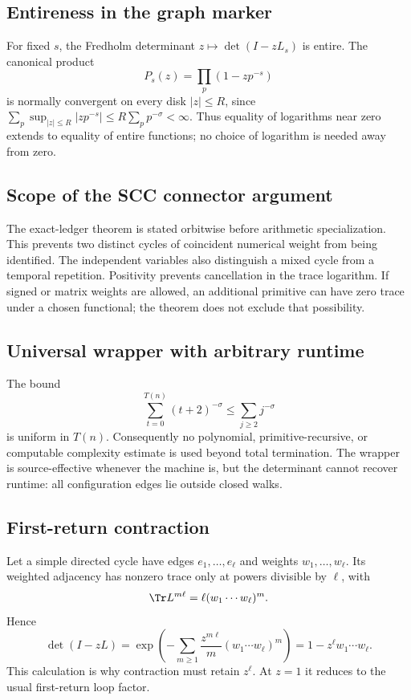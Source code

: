 \subsection{Entireness in the graph marker}

For fixed $s$, the Fredholm determinant $z\mapsto\det(I-zL_s)$ is entire.
The canonical product
\[
P_s(z)=\prod_p(1-zp^{-s})
\]
is normally convergent on every disk $|z|\le R$, since
$\sum_p\sup_{|z|\le R}|zp^{-s}|\le R\sum_pp^{-\sigma}<\infty$.
Thus equality of logarithms near zero extends to equality of entire
functions; no choice of logarithm is needed away from zero.

\subsection{Scope of the SCC connector argument}

The exact-ledger theorem is stated orbitwise before arithmetic
specialization.  This prevents two distinct cycles of coincident numerical
weight from being identified.  The independent variables also distinguish a
mixed cycle from a temporal repetition.  Positivity prevents cancellation in
the trace logarithm.  If signed or matrix weights are allowed, an additional
primitive can have zero trace under a chosen functional; the theorem does not
exclude that possibility.

\subsection{Universal wrapper with arbitrary runtime}

The bound
\[
\sum_{t=0}^{T(n)}(t+2)^{-\sigma}
\le\sum_{j\ge2}j^{-\sigma}
\]
is uniform in $T(n)$.  Consequently no polynomial, primitive-recursive, or
computable complexity estimate is used beyond total termination.  The
wrapper is source-effective whenever the machine is, but the determinant
cannot recover runtime: all configuration edges lie outside closed walks.

\subsection{First-return contraction}

Let a simple directed cycle have edges $e_1,\ldots,e_\ell$ and weights
$w_1,\ldots,w_\ell$.  Its weighted adjacency has nonzero trace only at powers
divisible by $\ell$, with
\[
\Tr L^{m\ell}=\ell(w_1\cdots w_\ell)^m.
\]
Hence
\[
\det(I-zL)
=\exp\left(-\sum_{m\ge1}\frac{z^{m\ell}}{m}
(w_1\cdots w_\ell)^m\right)
=1-z^\ell w_1\cdots w_\ell.
\]
This calculation is why contraction must retain $z^\ell$.  At $z=1$ it
reduces to the usual first-return loop factor.
